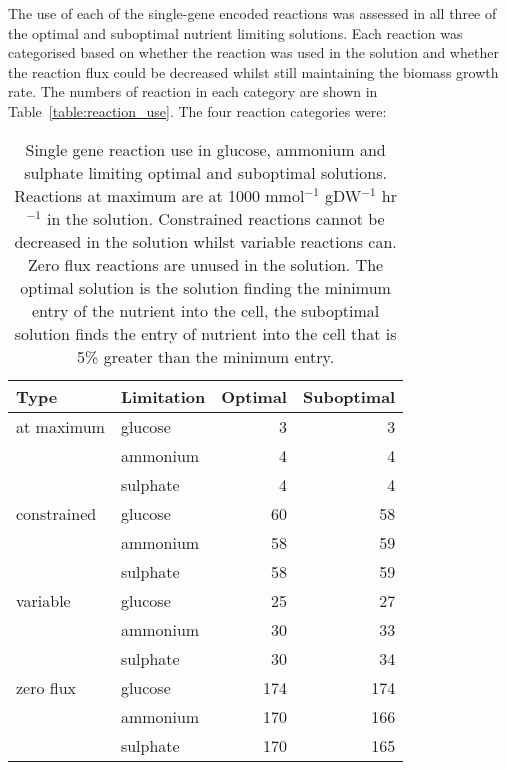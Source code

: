 The use of each of the single-gene encoded reactions was assessed in all three of the optimal and suboptimal nutrient limiting solutions. Each reaction was categorised based on whether the reaction was used in the solution and whether the reaction flux could be decreased whilst still maintaining the biomass growth rate. The numbers of reaction in each category are shown in Table~\vref{table:reaction_use}. The four reaction categories were:

\begin{table}%
  \centering
  \begin{tabular}{l l r r}
                                                       \toprule
    Type        & Limitation & Optimal & Suboptimal \\ \midrule
    at maximum  & glucose    &       3 &          3 \\
                & ammonium   &       4 &          4 \\
                & sulphate   &       4 &          4 \\
    constrained & glucose    &      60 &         58 \\
                & ammonium   &      58 &         59 \\
                & sulphate   &      58 &         59 \\
    variable    & glucose    &      25 &         27 \\
                & ammonium   &      30 &         33 \\
                & sulphate   &      30 &         34 \\
    zero flux   & glucose    &     174 &        174 \\
                & ammonium   &     170 &        166 \\
                & sulphate   &     170 &        165 \\ \bottomrule
  \end{tabular}
  \caption[Types of reaction in glucose, ammonium and sulphate limitation]{Single gene reaction use in glucose, ammonium and sulphate limiting optimal and suboptimal solutions. Reactions at maximum are at 1000 mmol$^{-1}$ gDW$^{-1}$ hr$^{-1}$ in the solution. Constrained reactions cannot be decreased in the solution whilst variable reactions can. Zero flux reactions are unused in the solution. The optimal solution is the solution finding the minimum entry of the nutrient into the cell, the suboptimal solution finds the entry of nutrient into the cell that is 5\% greater than the minimum entry. }
  \label{table:reaction_use}
\end{table}%

